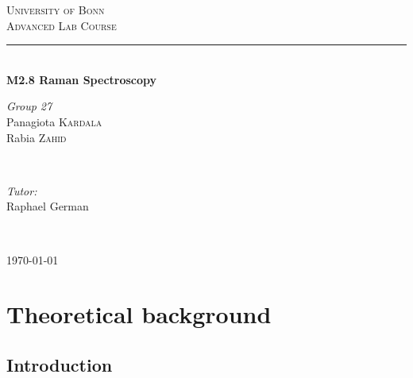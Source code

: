 \documentclass[openany,11pt,a4paper]{report}
\begin{document}
\pagestyle{empty}


\begin{titlepage}

\newcommand{\HRule}{\rule{\linewidth}{0.5mm}} 
\center 

\textsc{\LARGE University of Bonn}\\[1.5cm]
\textsc{\Large Advanced Lab Course}\\[0.5cm] 

\vfill


\HRule \\[0.4cm]
{\huge \textbf {M2.8 Raman Spectroscopy }}

 
\vfill

\begin{minipage}{0.4\textwidth}
\begin{flushleft} \large
\emph{Group 27}\\
Panagiota \textsc{Kardala}\\
Rabia \textsc{Zahid} 
\end{flushleft}
\end{minipage}
~
\begin{minipage}{0.4\textwidth}
\begin{flushright} \large
\emph{Tutor:} \\
{Raphael German} 
\end{flushright}
\end{minipage}\\[4cm]


\vfill

{\large \today}\\[3cm] 

\vfill

\end{titlepage}



\pagestyle{plain}

\tableofcontents







\begin{abstract}

\end{abstract}


\chapter{Theoretical background}

\section{Introduction}
\end{document}
